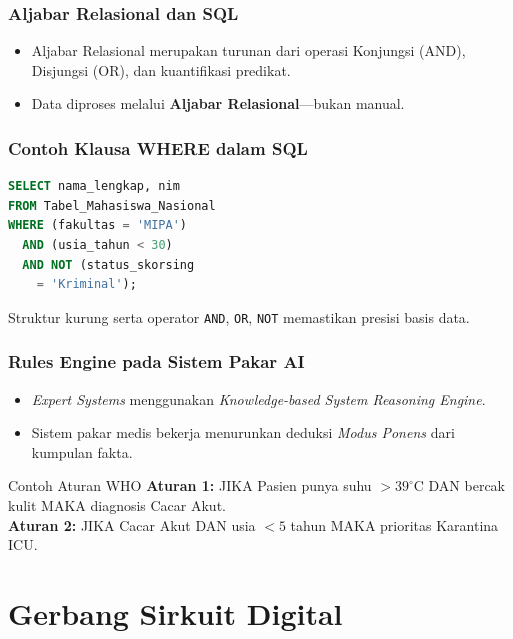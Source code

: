 \documentclass[handout]{beamer}
\theoremstyle{definition}
\theoremstyle{example}
\begin{document}
\begin{frame}
\frametitle{Aljabar Relasional dan SQL}
\begin{itemize}
  \item Aljabar Relasional merupakan turunan dari operasi Konjungsi (AND), Disjungsi (OR), dan kuantifikasi predikat.
  \item Data diproses melalui \textbf{Aljabar Relasional}---bukan manual.
\end{itemize}
\end{frame}

\begin{frame}[fragile]
\frametitle{Contoh Klausa WHERE dalam SQL}
\begin{lstlisting}[language=SQL, basicstyle=\ttfamily\scriptsize, frame=single,
  breaklines=true, breakatwhitespace=true, columns=fullflexible,
  linewidth=0.92\linewidth]
SELECT nama_lengkap, nim 
FROM Tabel_Mahasiswa_Nasional
WHERE (fakultas = 'MIPA') 
  AND (usia_tahun < 30) 
  AND NOT (status_skorsing 
    = 'Kriminal');
\end{lstlisting}
\begin{block}{}
Struktur kurung serta operator \texttt{AND}, \texttt{OR}, \texttt{NOT} memastikan presisi basis data.
\end{block}
\end{frame}

\begin{frame}
\frametitle{Rules Engine pada Sistem Pakar AI}
\begin{itemize}
  \item \textit{Expert Systems} menggunakan \textit{Knowledge-based System Reasoning Engine}.
  \item Sistem pakar medis bekerja menurunkan deduksi \textit{Modus Ponens} dari kumpulan fakta.
\end{itemize}
\begin{block}{Contoh Aturan WHO}
\textbf{Aturan 1:} JIKA Pasien punya suhu $> 39^\circ$C DAN bercak kulit MAKA diagnosis Cacar Akut.\\
\textbf{Aturan 2:} JIKA Cacar Akut DAN usia $< 5$ tahun MAKA prioritas Karantina ICU.
\end{block}
\end{frame}

\section{Gerbang Sirkuit Digital}
\end{document}
